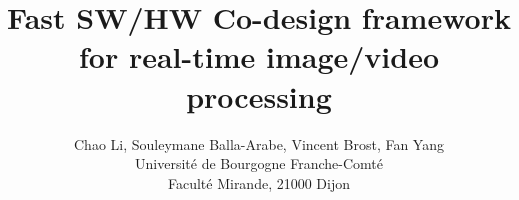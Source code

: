 \title{Fast SW/HW Co-design framework for real-time image/video processing}

\author{Chao Li, Souleymane Balla-Arabe, Vincent Brost, Fan Yang\\
Universit\'e de Bourgogne Franche-Comt\'e\\
Facult\'e Mirande, 21000 Dijon\\}
